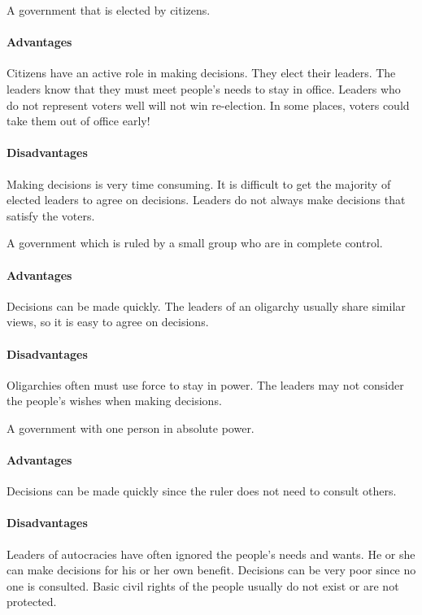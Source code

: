 \begin{definition}
  A government that is elected by citizens.

  \paragraph{Advantages} Citizens have an active role in making decisions. They
  elect their leaders. The leaders know that they must meet people's needs to
  stay in office. Leaders who do not represent voters well will not win
  re-election. In some places, voters could take them out of office early!

  \paragraph{Disadvantages} Making decisions is very time consuming. It is
  difficult to get the majority of elected leaders to agree on decisions.
  Leaders do not always make decisions that satisfy the voters.
\end{definition}

\begin{definition}[Oligarchy]
  A government which is ruled by a small group who are in complete control.

  \paragraph{Advantages} Decisions can be made quickly. The leaders of an
  oligarchy usually share similar views, so it is easy to agree on decisions.

  \paragraph{Disadvantages} Oligarchies often must use force to stay in power.
  The leaders may not consider the people's wishes when making decisions.
\end{definition}

\begin{definition}[Autocracy]
  A government with one person in absolute power.

  \paragraph{Advantages} Decisions can be made quickly since the ruler does not
  need to consult others.	

  \paragraph{Disadvantages} Leaders of autocracies have often ignored the
  people's needs and wants. He or she can make decisions for his or her own
  benefit. Decisions can be very poor since no one is consulted. Basic civil
  rights of the people usually do not exist or are not protected.
\end{definition}

